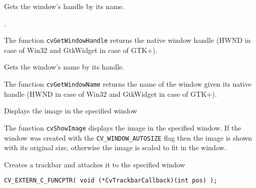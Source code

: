 \ifC
{}

Gets the window's handle by its name.


\begin{description}
.
\end{description}

The function \texttt{cvGetWindowHandle} returns the native window handle (HWND in case of Win32 and GtkWidget in case of GTK+).


Gets the window's name by its handle.


\begin{description}
\end{description}

The function \texttt{cvGetWindowName} returns the name of the window given its native handle (HWND in case of Win32 and GtkWidget in case of GTK+).
\fi


Displays the image in the specified window


\begin{description}
\end{description}

The function \texttt{cvShowImage} displays the image in the specified window. If the window was created with the \texttt{CV\_WINDOW\_AUTOSIZE} flag then the image is shown with its original size, otherwise the image is scaled to fit in the window.


Creates a trackbar and attaches it to the specified window

\begin{lstlisting}
CV_EXTERN_C_FUNCPTR( void (*CvTrackbarCallback)(int pos) );
\end{lstlisting}

